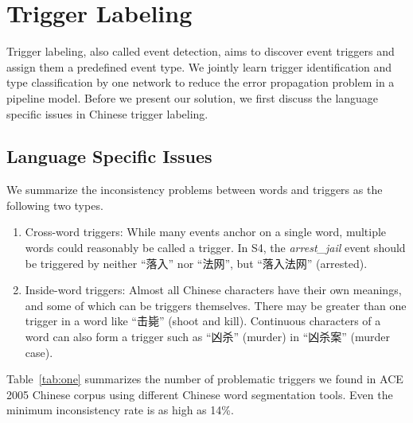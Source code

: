 \section{Trigger Labeling}\label{trigger}
Trigger labeling, also called event detection, aims to discover event triggers and assign them a predefined event type. We jointly learn trigger identification and type classification by one network to reduce the error propagation problem in a pipeline model. Before we present our solution, we first discuss the language specific issues in Chinese trigger labeling.

\subsection{Language Specific Issues}
We summarize the inconsistency problems between words and triggers as the following two types.

\begin{enumerate}
	\item Cross-word triggers: While many events anchor on a single word, multiple words could reasonably be called a trigger. In S4, the \emph{arrest\_jail} event should be triggered by neither ``落入'' nor ``法网'', but ``落入法网'' (arrested).
	\item Inside-word triggers: Almost all Chinese characters have their own meanings, and some of which can be triggers themselves. There may be greater than one trigger in a word like ``击毙'' (shoot and kill). Continuous characters of a word can also form a trigger such as ``凶杀'' (murder) in ``凶杀案'' (murder case).
\end{enumerate}

Table~\ref{tab:one} summarizes the number of problematic triggers we found in ACE 2005 Chinese corpus using different Chinese word segmentation tools. Even the minimum inconsistency rate is as high as 14\%.

\begin{savenotes}
\begin{table}
\centering
{}
\end{table}
\end{savenotes}

